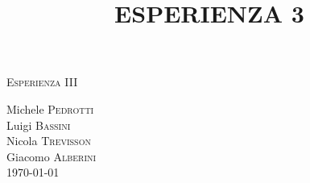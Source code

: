 \documentclass[11pt]{article}
\begin{document}
\begin{center}



\textsc{\Huge Esperienza III}\\[0.5cm]



\large
\title{ESPERIENZA 3}

Michele \textsc{Pedrotti}\\
Luigi \textsc{Bassini}\\
Nicola \textsc{Trevisson}\\
Giacomo \textsc{Alberini}\\
\today





\end{center}


~\\
\end{document}
